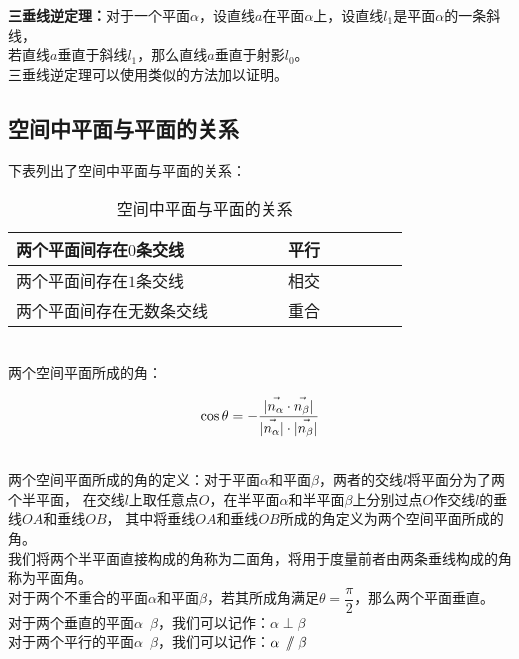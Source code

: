 \documentclass[UTF8]{ctexart}
\let\nvec\vec
\def\vec#1{\nvec{\vphantom b\smash{#1}}}
\renewcommand\parallel{{\hspace{3.0pt}\mathrel{/\mskip-6.5mu/}\hspace{2.6pt}}}
\begin{document}
    \textbf{三垂线逆定理：}对于一个平面$\alpha$，设直线$a$在平面$\alpha$上，设直线$l_1$是平面$\alpha$的一条斜线，\\
    若直线$a$垂直于斜线$l_1$，那么直线$a$垂直于射影$l_0$。\\[4mm]
    三垂线逆定理可以使用类似的方法加以证明。

\newpage

\subsection{空间中平面与平面的关系}
    下表列出了空间中平面与平面的关系：
    \begin{table}[h]
        \begin{center}
            \begin{tabular}{l|l}
                \hline
                两个平面间存在$0$条交线~~~~~~~~&平行~~~~~~~~\\ \hline
                两个平面间存在$1$条交线~~~~~~~~&相交~~~~~~~~\\ \hline
                两个平面间存在无数条交线~~~~~~~~&重合~~~~~~~~\\ \hline
            \end{tabular}
            \caption{空间中平面与平面的关系}
        \end{center}
    \end{table}\\
    两个空间平面所成的角：
    \begin{large}
        \begin{equation*}
            \cos{\theta}=-\frac{|\vec{n_\alpha}\cdot\vec{n_\beta}|}{|\vec{n_\alpha}|\cdot|\vec{n_\beta}|}
        \end{equation*}
    \end{large}\\
    两个空间平面所成的角的定义：对于平面$\alpha$和平面$\beta$，两者的交线$l$将平面分为了两个半平面，
    在交线$l$上取任意点$O$，在半平面$\alpha$和半平面$\beta$上分别过点$O$作交线$l$的垂线$OA$和垂线$OB$，
    其中将垂线$OA$和垂线$OB$所成的角定义为两个空间平面所成的角。\\[3mm]
    我们将两个半平面直接构成的角称为二面角，将用于度量前者由两条垂线构成的角称为平面角。\\[3mm]
    对于两个不重合的平面$\alpha$和平面$\beta$，若其所成角满足$\theta=\dfrac{\pi}{2}$，那么两个平面垂直。\\[3mm]
    对于两个垂直的平面$\alpha$~$\beta$，我们可以记作：$\alpha\perp\beta$\\[3mm]
    对于两个平行的平面$\alpha$~$\beta$，我们可以记作：$\alpha\,\parallel\beta$\\[6mm]
\end{document}
